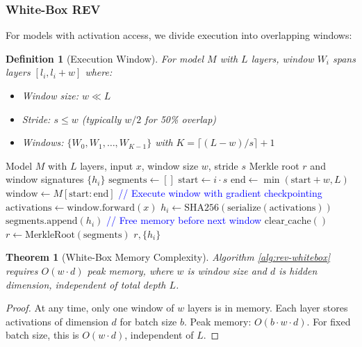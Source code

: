 \documentclass[11pt,a4paper]{article}
\newtheorem{theorem}{Theorem}
\newtheorem{definition}{Definition}
\begin{document}
\subsubsection{White-Box REV}

For models with activation access, we divide execution into overlapping windows:

\begin{definition}[Execution Window]
For model $M$ with $L$ layers, window $W_i$ spans layers $[l_i, l_i + w]$ where:
\begin{itemize}
\item Window size: $w \ll L$
\item Stride: $s \leq w$ (typically $w/2$ for 50\% overlap)
\item Windows: $\{W_0, W_1, \ldots, W_{K-1}\}$ with $K = \lceil (L-w)/s \rceil + 1$
\end{itemize}
\end{definition}

\begin{algorithm}
\caption{White-Box REV Execution}
\label{alg:rev-whitebox}
\begin{algorithmic}[1]
\Require Model $M$ with $L$ layers, input $x$, window size $w$, stride $s$
\Ensure Merkle root $r$ and window signatures $\{h_i\}$
\State $\text{segments} \gets []$
    \State $\text{start} \gets i \cdot s$
    \State $\text{end} \gets \min(\text{start} + w, L)$
    \State $\text{window} \gets M[\text{start}:\text{end}]$
    \State \textcolor{blue}{// Execute window with gradient checkpointing}
    \State $\text{activations} \gets \text{window.forward}(x)$
    \State $h_i \gets \text{SHA256}(\text{serialize}(\text{activations}))$
    \State $\text{segments.append}(h_i)$
    \State \textcolor{blue}{// Free memory before next window}
    \State $\text{clear\_cache}()$
\EndFor
\State $r \gets \text{MerkleRoot}(\text{segments})$
\State \Return $r, \{h_i\}$
\end{algorithmic}
\end{algorithm}

\begin{theorem}[White-Box Memory Complexity]
Algorithm \ref{alg:rev-whitebox} requires $O(w \cdot d)$ peak memory, where $w$ is window size and $d$ is hidden dimension, independent of total depth $L$.
\end{theorem}

\begin{proof}
At any time, only one window of $w$ layers is in memory. Each layer stores activations of dimension $d$ for batch size $b$. Peak memory: $O(b \cdot w \cdot d)$. For fixed batch size, this is $O(w \cdot d)$, independent of $L$.
\end{proof}
\end{document}
